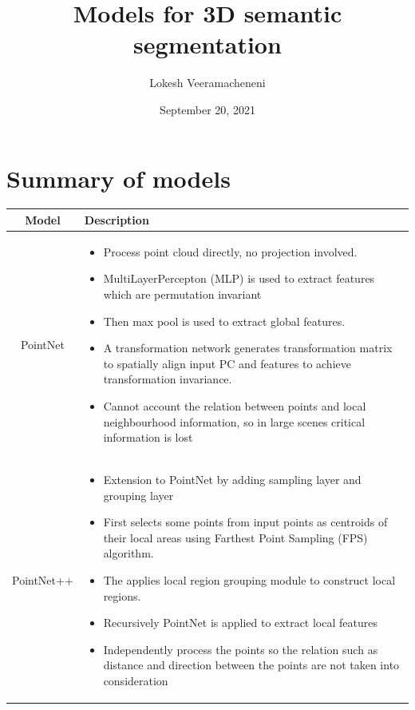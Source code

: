 \documentclass[12pt]{article}
\title{Models for 3D semantic segmentation}
\author{Lokesh Veeramacheneni}
\date{September 20, 2021}
\begin{document}
\maketitle



\section{Summary of models}
\begin{longtable}{|c|L|}%
    \hline
    \textbf{Model}   &  \textbf{Description}\\ \hline
       PointNet \cite{001}  &  \begin{itemize}
           \item Process point cloud directly, no projection involved.
           \item MultiLayerPercepton (MLP) is used to extract features which are permutation invariant
           \item Then max pool is used to extract global features.
           \item A transformation network generates transformation matrix to spatially align input PC and features to achieve transformation invariance.
           \item Cannot account the relation between points and local neighbourhood information, so in large scenes critical information is lost
       \end{itemize}\\ \hline
       
       PointNet++ \cite{001} & \begin{itemize}
           \item Extension to PointNet by adding sampling layer and grouping layer
           \item First selects some points from input points as centroids of their local areas using Farthest Point Sampling (FPS) algorithm.
           \item The applies local region grouping module to construct local regions.
           \item Recursively PointNet is applied to extract local features
           \item Independently process the points so the relation such as distance and direction between the points are not taken into consideration
       \end{itemize} \\ \hline
       

\end{longtable}
\end{document}
